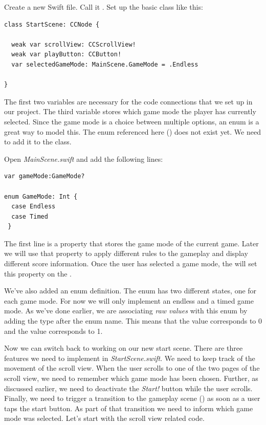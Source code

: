 \begin{leftbar}
Create a new Swift file. Call it . Set up the basic
 class like this:
\begin{lstlisting}
class StartScene: CCNode {
  
  weak var scrollView: CCScrollView!
  weak var playButton: CCButton!
  var selectedGameMode: MainScene.GameMode = .Endless
  
}
\end{lstlisting}
\end{leftbar}
The first two variables are necessary for the code connections that we set up
in our \SB{} project. The third variable stores which game mode the player has
currently selected. Since the game mode is a choice between multiple options, an
enum is a great way to model this. The enum referenced here
() does not exist yet. We need to add it to the
 class.

\begin{leftbar}
Open \textit{MainScene.swift} and add the following lines:
\begin{lstlisting}
var gameMode:GameMode?
  
enum GameMode: Int {
  case Endless
  case Timed
 }
\end{lstlisting}
\end{leftbar}
The first line is a property that stores the game mode of the current game.
Later we will use that property to apply different rules to the gameplay and
display different score information. Once the user has selected a game mode, the
 will set this property on the .

We've also added an enum definition. The  enum has two
different states, one for each game mode. For now we will only implement an
endless and a timed game mode. As we've done earlier, we are associating
\textit{raw values} with this enum by adding the  type after the
enum name. This means that the  value corresponds to 0 and
the  value corresponds to 1.

Now we can switch back to working on our new start scene. There are three
features we need to implement in \textit{StartScene.swift}. We need to keep
track of the movement of the scroll view. When the user scrolls to one of the
two pages of the scroll view, we need to remember which game mode has been
chosen. Further, as discussed earlier, we need to deactivate the \textit{Start!}
button while the user scrolls. Finally, we need to trigger a transition to the
gameplay scene () as soon as a user taps the start button.
As part of that transition we need to inform  which game
mode was selected. Let's start with the scroll view related code.

